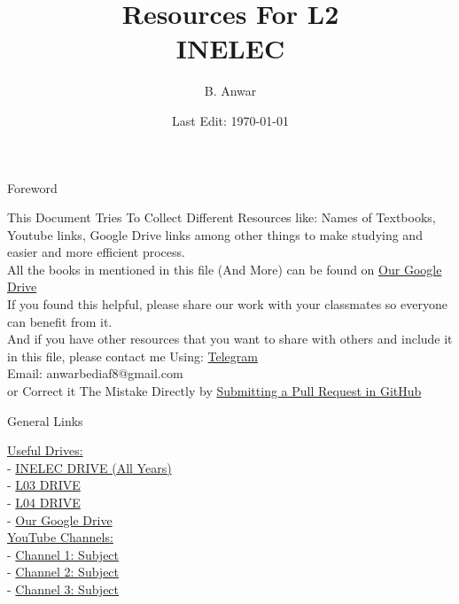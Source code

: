 \documentclass{article}
\author{B. Anwar}
\title{Resources For L2 \\ INELEC}
\date{Last Edit: \today}
\begin{document}
  
\maketitle

\newpage
\begin{center}
    \Huge Foreword
\end{center}

\indent This Document Tries To Collect Different Resources like: Names of Textbooks, Youtube links, Google Drive links among other things to make studying and easier and more efficient process.\\

All the books in mentioned in this file (And More) can be found on \href{https://drive.google.com/drive/u/0/folders/1CWgKqywhDzqRSvL7jl189d54OyrJS_s1}{Our Google Drive}\\

If you found this helpful, please share our work with your classmates so everyone can benefit from it.\\

And if you have other resources that you want to share with others and include it in this file, please contact me Using:
\href{https://t.me/anwarbediaf}{Telegram} \\
Email: \color{cyan} anwarbediaf8@gmail.com \color{black}  \\ or 
Correct it The Mistake Directly by \href{URL}{Submitting a Pull Request in GitHub}

\newpage
\begin{center}
    \huge General Links
\end{center}
\underline{\Large Useful Drives:}\\ [.15cm]
 - \href{https://drive.google.com/drive/u/0/folders/1xHYLk9QP8jp-y56j3HuCtZm0zY7AbnHj}{INELEC DRIVE (All Years)}\\
 - \href{https://drive.google.com/drive/u/0/folders/11Va9waxilcsSdgR665WacbD1JFjO4703}{L03 DRIVE}\\
 - \href{https://drive.google.com/drive/u/0/folders/1wHUM_XDeau1BH4eceBJuJ1M2bLB564QF}{L04 DRIVE}\\
 - \href{https://drive.google.com/drive/u/0/folders/1CWgKqywhDzqRSvL7jl189d54OyrJS_s1}{Our Google Drive}\\

\noindent \underline{\large YouTube Channels:} \\ [.15cm]
 - \href{URL}{Channel 1: Subject}\\
 - \href{URL}{Channel 2: Subject}\\
 - \href{URL}{Channel 3: Subject}\\
\end{document}
